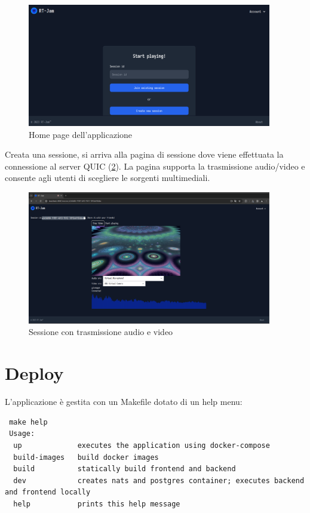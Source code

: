 \documentclass{article}
\begin{document}
\begin{figure}[h]
  \begin{center}
    \includegraphics[width=0.95\textwidth]{figures/home_page.png}
  \end{center}
  \caption{Home page dell'applicazione}\label{fig:home-page}
\end{figure}

Creata una sessione, si arriva alla pagina di sessione dove viene effettuata la connessione 
al server QUIC (\cref{fig:session2}). 
La pagina supporta la trasmissione audio/video e consente agli utenti di scegliere le 
sorgenti multimediali.


\begin{figure}[h]
  \begin{center}
    \includegraphics[width=0.95\textwidth]{figures/session2_page.png}
  \end{center}
  \caption{Sessione con trasmissione audio e video}\label{fig:session2}
\end{figure}


\clearpage
\section{Deploy}
L'applicazione è gestita con un Makefile dotato di un help menu:
\begin{verbatim}
 make help
 Usage:
  up             executes the application using docker-compose
  build-images   build docker images
  build          statically build frontend and backend
  dev            creates nats and postgres container; executes backend and frontend locally
  help           prints this help message
\end{verbatim}
\end{document}
